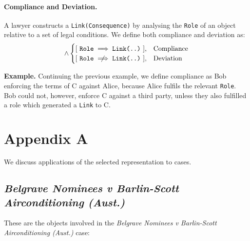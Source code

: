 \documentclass{article}
\numberwithin{equation}{section}
\newcommand{\quickexample}[1]{
\begin{tcolorbox}
	\textbf{Example.} #1
\end{tcolorbox}
}
\begin{document}
\pagebreak

\paragraph{Compliance and Deviation.} A lawyer constructs a \texttt{Link(Consequence)} by analysing the \texttt{Role} of an object relative to a set of legal conditions. We define both compliance and deviation as:
\begin{equation}
[ \ \exists \ \texttt{Link(Existence, Consequence)} \ ] \land 
	\begin{cases}
		[ \ \texttt{Role} \implies \texttt{Link(..)} \ ], & \text{Compliance} \\
		[ \ \texttt{Role} \centernot\implies \texttt{Link(..)} \ ], & \text{Deviation}
	\end{cases}
\end{equation}

\vspace{0.25cm}
\quickexample{
	Continuing the previous example, we define compliance as Bob enforcing the terms of C against Alice, because Alice fulfils the relevant \texttt{Role}. Bob could not, however, enforce C against a third party, unless they also fulfilled a role which generated a \texttt{Link} to C.
}
















\pagebreak
\section{Appendix A}

We discuss applications of the selected representation to cases.

\subsection{\textit{Belgrave Nominees v Barlin-Scott Airconditioning (Aust.)}}  

These are the objects involved in the \textit{Belgrave Nominees v Barlin-Scott Airconditioning (Aust.)} case:
\end{document}
